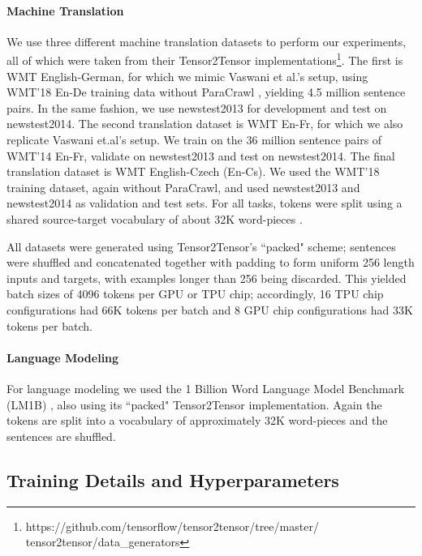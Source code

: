 \documentclass{article}
\newcommand\nohyph{\hyphenpenalty=10000\relax\exhyphenpenalty=10000\relax}
\begin{document}
\paragraph{Machine Translation} We use three different machine translation datasets to perform our experiments, all of which were taken from their Tensor2Tensor implementations\footnote{\nohyph https://github.com/tensorflow/tensor2tensor/tree/master/ tensor2tensor/data\_generators}. The first is WMT English-German, for which we mimic Vaswani et al.'s  setup, using WMT'18 En-De training data without ParaCrawl \cite{paracrawl18}, yielding 4.5 million sentence pairs. In the same fashion, we use newstest2013 for development and test on newstest2014. The second translation dataset is WMT En-Fr, for which we also replicate Vaswani et.al's  setup. We train on the 36 million sentence pairs of WMT'14 En-Fr, validate on newstest2013 and test on newstest2014. The final translation dataset is WMT English-Czech (En-Cs). We used the WMT'18 training dataset, again without ParaCrawl, and used newstest2013 and newstest2014 as validation and test sets. For all tasks, tokens were split using a shared source-target vocabulary of about 32K word-pieces \cite{wu16}.

All datasets were generated using Tensor2Tensor's ``packed" scheme; sentences were shuffled and concatenated together with padding to form uniform 256 length inputs and targets, with examples longer than 256 being discarded. This yielded batch sizes of 4096 tokens per GPU or TPU chip; accordingly, 16 TPU chip configurations had 66K tokens per batch and 8 GPU chip configurations had 33K tokens per batch.

\paragraph{Language Modeling} For language modeling we used the 1 Billion Word Language Model Benchmark (LM1B) \cite{chelba13}, also using its ``packed" Tensor2Tensor implementation. Again the tokens are split into a vocabulary of approximately 32K word-pieces and the sentences are shuffled.



\subsection{Training Details and Hyperparameters}
\end{document}
